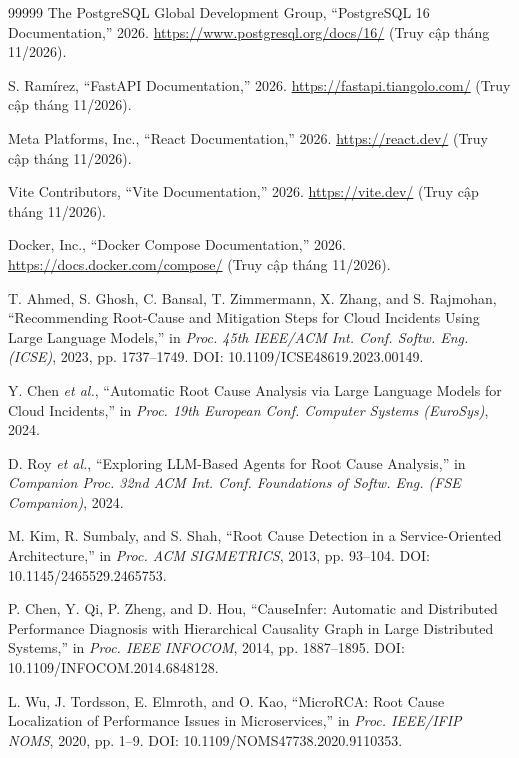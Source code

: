 \documentclass[a4paper,table]{article}
\theoremstyle{definition}
\begin{document}
\begin{thebibliography}{99999}
The PostgreSQL Global Development Group, ``PostgreSQL 16 Documentation,'' 2026. \url{https://www.postgresql.org/docs/16/} (Truy cập tháng 11/2026).

S. Ramírez, ``FastAPI Documentation,'' 2026. \url{https://fastapi.tiangolo.com/} (Truy cập tháng 11/2026).

Meta Platforms, Inc., ``React Documentation,'' 2026. \url{https://react.dev/} (Truy cập tháng 11/2026).

Vite Contributors, ``Vite Documentation,'' 2026. \url{https://vite.dev/} (Truy cập tháng 11/2026).

Docker, Inc., ``Docker Compose Documentation,'' 2026. \url{https://docs.docker.com/compose/} (Truy cập tháng 11/2026).

T. Ahmed, S. Ghosh, C. Bansal, T. Zimmermann, X. Zhang, and S. Rajmohan, ``Recommending Root-Cause and Mitigation Steps for Cloud Incidents Using Large Language Models,'' in \textit{Proc. 45th IEEE/ACM Int. Conf. Softw. Eng. (ICSE)}, 2023, pp. 1737--1749. DOI: 10.1109/ICSE48619.2023.00149.

Y. Chen \textit{et al.}, ``Automatic Root Cause Analysis via Large Language Models for Cloud Incidents,'' in \textit{Proc. 19th European Conf. Computer Systems (EuroSys)}, 2024.

D. Roy \textit{et al.}, ``Exploring LLM-Based Agents for Root Cause Analysis,'' in \textit{Companion Proc. 32nd ACM Int. Conf. Foundations of Softw. Eng. (FSE Companion)}, 2024.

M. Kim, R. Sumbaly, and S. Shah, ``Root Cause Detection in a Service-Oriented Architecture,'' in \textit{Proc. ACM SIGMETRICS}, 2013, pp. 93--104. DOI: 10.1145/2465529.2465753.

P. Chen, Y. Qi, P. Zheng, and D. Hou, ``CauseInfer: Automatic and Distributed Performance Diagnosis with Hierarchical Causality Graph in Large Distributed Systems,'' in \textit{Proc. IEEE INFOCOM}, 2014, pp. 1887--1895. DOI: 10.1109/INFOCOM.2014.6848128.

L. Wu, J. Tordsson, E. Elmroth, and O. Kao, ``MicroRCA: Root Cause Localization of Performance Issues in Microservices,'' in \textit{Proc. IEEE/IFIP NOMS}, 2020, pp. 1--9. DOI: 10.1109/NOMS47738.2020.9110353.


\end{thebibliography}
\end{document}
